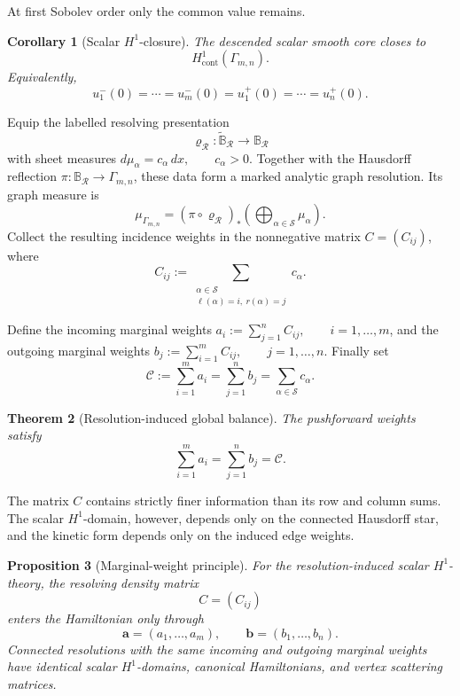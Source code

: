 \documentclass[11pt]{article}
\theoremstyle{plain}
\newtheorem{theorem}{Theorem}[section]
\newtheorem{proposition}[theorem]{Proposition}
\newtheorem{corollary}[theorem]{Corollary}
\theoremstyle{definition}
\begin{document}
At first Sobolev order only the common value remains.

\begin{corollary}[Scalar \(H^1\)-closure]
\label{cor:Bmn-H1}
The descended scalar smooth core closes to
\[
  H^1_{\mathrm{cont}}(\Gamma_{m,n}).
\]
Equivalently,
\[
  u_1^-(0)
  =
  \cdots
  =
  u_m^-(0)
  =
  u_1^+(0)
  =
  \cdots
  =
  u_n^+(0).
\]
\end{corollary}

Equip the labelled resolving presentation
\[
  \varrho_{\mathcal R}:
  \widetilde{\mathbb B}_{\mathcal R}
  \longrightarrow
  \mathbb B_{\mathcal R}
\]
with sheet measures
\(d\mu_\alpha=c_\alpha\,dx, \qquad c_\alpha>0\).
Together with the Hausdorff reflection
\(\pi:\mathbb B_{\mathcal R}\to\Gamma_{m,n}\), these data form a marked
analytic graph resolution. Its graph measure is
\[
  \mu_{\Gamma_{m,n}}
  =
  (\pi\circ\varrho_{\mathcal R})_*
  \left(
    \bigoplus_{\alpha\in\mathcal S}\mu_\alpha
  \right).
\]
Collect the resulting incidence weights in the nonnegative matrix
\(C=(C_{ij})\),
where
\[
  C_{ij}
  :=
  \sum_{\substack{
    \alpha\in\mathcal S\\
    \ell(\alpha)=i,\ r(\alpha)=j
  }}
  c_\alpha.
\]

Define the incoming marginal weights
\(a_i := \sum_{j=1}^{n}C_{ij}, \qquad i=1,\ldots,m\),
and the outgoing marginal weights
\(b_j := \sum_{i=1}^{m}C_{ij}, \qquad j=1,\ldots,n\).
Finally set
\[
  \mathcal C
  :=
  \sum_{i=1}^{m}a_i
  =
  \sum_{j=1}^{n}b_j
  =
  \sum_{\alpha\in\mathcal S}c_\alpha.
\]

\begin{theorem}[Resolution-induced global balance]
\label{thm:Bmn-global-balance}
The pushforward weights satisfy
\[
  \sum_{i=1}^{m}a_i
  =
  \sum_{j=1}^{n}b_j
  =
  \mathcal C.
\]
\end{theorem}

The matrix \(C\) contains strictly finer information than its row and column
sums. The scalar \(H^1\)-domain, however, depends only on the connected
Hausdorff star, and the kinetic form depends only on the induced edge
weights.

\begin{proposition}[Marginal-weight principle]
\label{prop:Bmn-marginal-principle}
For the resolution-induced scalar \(H^1\)-theory, the resolving density matrix
\[
  C=(C_{ij})
\]
enters the Hamiltonian only through
\[
  \mathbf a=(a_1,\ldots,a_m),
  \qquad
  \mathbf b=(b_1,\ldots,b_n).
\]
Connected resolutions with the same incoming and outgoing
marginal weights have identical scalar \(H^1\)-domains, canonical
Hamiltonians, and vertex scattering matrices.
\end{proposition}
\end{document}
